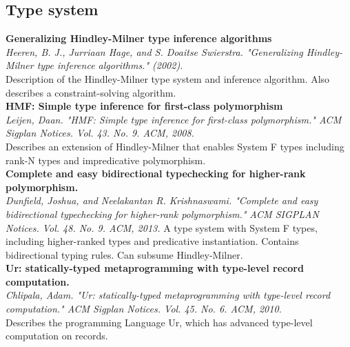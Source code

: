 \documentclass[12pt]{article}
\begin{document}
\subsection{Type system}
\textbf{Generalizing Hindley-Milner type inference algorithms} \\
\textit{Heeren, B. J., Jurriaan Hage, and S. Doaitse Swierstra. "Generalizing Hindley-Milner type inference algorithms." (2002).} \\
Description of the Hindley-Milner type system and inference algorithm. Also describes a constraint-solving algorithm.
\\
\textbf{HMF: Simple type inference for first-class polymorphism} \\
\textit{Leijen, Daan. "HMF: Simple type inference for first-class polymorphism." ACM Sigplan Notices. Vol. 43. No. 9. ACM, 2008.} \\
Describes an extension of Hindley-Milner that enables System F types including rank-N types and impredicative polymorphism.
\\
\textbf{Complete and easy bidirectional typechecking for higher-rank polymorphism.} \\
\textit{Dunfield, Joshua, and Neelakantan R. Krishnaswami. "Complete and easy bidirectional typechecking for higher-rank polymorphism." ACM SIGPLAN Notices. Vol. 48. No. 9. ACM, 2013.} 
A type system with System F types, including higher-ranked types and predicative instantiation. Contains bidirectional typing rules. Can subsume Hindley-Milner.
\\
\textbf{Ur: statically-typed metaprogramming with type-level record computation.} \\
\textit{Chlipala, Adam. "Ur: statically-typed metaprogramming with type-level record computation." ACM Sigplan Notices. Vol. 45. No. 6. ACM, 2010.} \\
Describes the programming Language Ur, which has advanced type-level computation on records.
\end{document}

